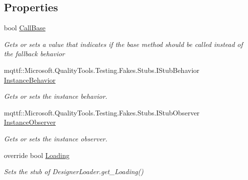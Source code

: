 \subsection*{Properties}
\begin{DoxyCompactItemize}
\item 
bool \hyperlink{class_system_1_1_component_model_1_1_design_1_1_serialization_1_1_fakes_1_1_stub_designer_loader_ae4c0a4836a8a0718126bd8d57c7ace1a}{Call\-Base}
\begin{DoxyCompactList}\small\item\em Gets or sets a value that indicates if the base method should be called instead of the fallback behavior\end{DoxyCompactList}\item 
mqttf\-::\-Microsoft.\-Quality\-Tools.\-Testing.\-Fakes.\-Stubs.\-I\-Stub\-Behavior \hyperlink{class_system_1_1_component_model_1_1_design_1_1_serialization_1_1_fakes_1_1_stub_designer_loader_ae34ea33e7e2fe9fbcd69e7e4b0250cb1}{Instance\-Behavior}
\begin{DoxyCompactList}\small\item\em Gets or sets the instance behavior.\end{DoxyCompactList}\item 
mqttf\-::\-Microsoft.\-Quality\-Tools.\-Testing.\-Fakes.\-Stubs.\-I\-Stub\-Observer \hyperlink{class_system_1_1_component_model_1_1_design_1_1_serialization_1_1_fakes_1_1_stub_designer_loader_a263a803f21f1b44a3b3580716c401691}{Instance\-Observer}
\begin{DoxyCompactList}\small\item\em Gets or sets the instance observer.\end{DoxyCompactList}\item 
override bool \hyperlink{class_system_1_1_component_model_1_1_design_1_1_serialization_1_1_fakes_1_1_stub_designer_loader_a5bf21af1b99ad7e339e78047b8e363bd}{Loading}
\begin{DoxyCompactList}\small\item\em Sets the stub of Designer\-Loader.\-get\-\_\-\-Loading()\end{DoxyCompactList}\end{DoxyCompactItemize}



